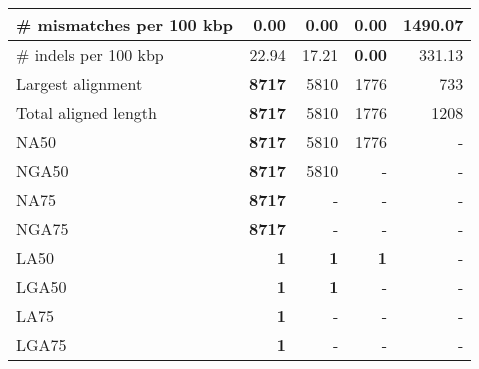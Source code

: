 \documentclass[12pt,a4paper]{article}
\begin{document}
\begin{table}[ht]
\begin{center}
\begin{tabular}{|l*{4}{|r}|}
\# mismatches per 100 kbp & {\bf 0.00} & {\bf 0.00} & {\bf 0.00} & 1490.07 \\ \hline
\# indels per 100 kbp & 22.94 & 17.21 & {\bf 0.00} & 331.13 \\ \hline
Largest alignment & {\bf 8717} & 5810 & 1776 & 733 \\ \hline
Total aligned length & {\bf 8717} & 5810 & 1776 & 1208 \\ \hline
NA50 & {\bf 8717} & 5810 & 1776 & - \\ \hline
NGA50 & {\bf 8717} & 5810 & - & - \\ \hline
NA75 & {\bf 8717} & - & - & - \\ \hline
NGA75 & {\bf 8717} & - & - & - \\ \hline
LA50 & {\bf 1} & {\bf 1} & {\bf 1} & - \\ \hline
LGA50 & {\bf 1} & {\bf 1} & - & - \\ \hline
LA75 & {\bf 1} & - & - & - \\ \hline
LGA75 & {\bf 1} & - & - & - \\ \hline
\end{tabular}
\end{center}
\end{table}
\end{document}
